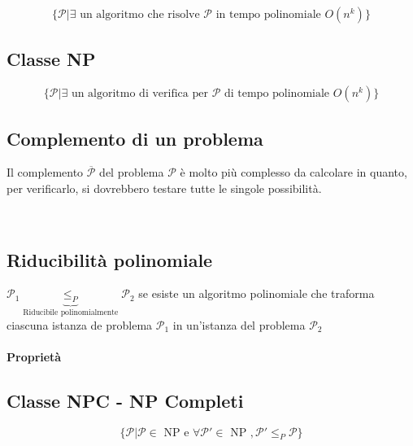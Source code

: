 \begin{equation}
\{\mathcal{P} | \exists \text{ un algoritmo che risolve } \mathcal{P} \text{ in tempo polinomiale } O(n^k)\}
\end{equation}



\subsection{Classe NP}

\begin{equation}
\{\mathcal{P} | \exists \text{ un algoritmo di verifica per } \mathcal{P} \text{ di tempo polinomiale } O(n^k) \}
\end{equation}



\subsection{Complemento di un problema}

Il complemento $\mathcal{\overline{P}}$ del problema $\mathcal{P}$ è molto più complesso da calcolare in quanto, per verificarlo, si dovrebbero testare tutte le singole possibilità.

\\


\subsection{Riducibilità polinomiale}

$\mathcal{P}_1 \underbrace{\leq_P}_\text{Riducibile polinomialmente} \mathcal{P}_2$ se esiste un algoritmo polinomiale che traforma ciascuna istanza de problema $\mathcal{P}_1$ in un'istanza del problema $\mathcal{P}_2$

\paragraph{Proprietà}


\subsection{Classe NPC - NP Completi}

\begin{equation}
\{\mathcal{P} | \mathcal{P} \in \text{ NP e } \forall \mathcal{P}' \in \text{ NP }, \mathcal{P}' \leq_P \mathcal{P} \}
\end{equation}

